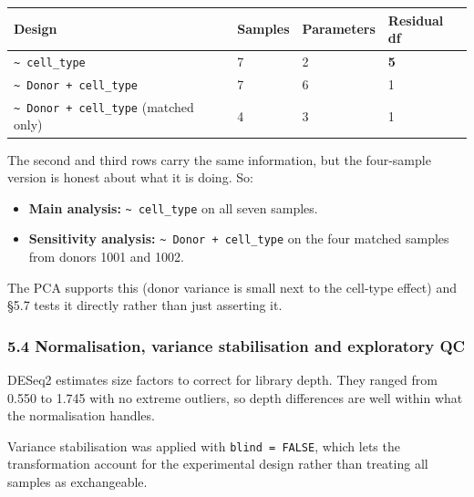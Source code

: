 \documentclass[
  11pt,
  a4paper,
]{article}
\providecommand{\tightlist}{%
  \setlength{\itemsep}{0pt}\setlength{\parskip}{0pt}}
\begin{document}
\begin{longtable}[]{@{}llll@{}}
\toprule\noalign{}
Design & Samples & Parameters & Residual df \\
\midrule\noalign{}
\endhead
\bottomrule\noalign{}
\endlastfoot
\texttt{\textasciitilde{}\ cell\_type} & 7 & 2 & \textbf{5} \\
\texttt{\textasciitilde{}\ Donor\ +\ cell\_type} & 7 & 6 & 1 \\
\texttt{\textasciitilde{}\ Donor\ +\ cell\_type} (matched only) & 4 & 3
& 1 \\
\end{longtable}

The second and third rows carry the same information, but the
four-sample version is honest about what it is doing. So:

\begin{itemize}
\tightlist
\item
  \textbf{Main analysis:} \texttt{\textasciitilde{}\ cell\_type} on all
  seven samples.
\item
  \textbf{Sensitivity analysis:}
  \texttt{\textasciitilde{}\ Donor\ +\ cell\_type} on the four matched
  samples from donors 1001 and 1002.
\end{itemize}

The PCA supports this (donor variance is small next to the cell-type
effect) and §5.7 tests it directly rather than just asserting it.

\hypertarget{normalisation-variance-stabilisation-and-exploratory-qc}{%
\subsubsection{5.4 Normalisation, variance stabilisation and exploratory
QC}\label{normalisation-variance-stabilisation-and-exploratory-qc}}

DESeq2 estimates size factors to correct for library depth. They ranged
from 0.550 to 1.745 with no extreme outliers, so depth differences are
well within what the normalisation handles.

Variance stabilisation was applied with \texttt{blind\ =\ FALSE}, which
lets the transformation account for the experimental design rather than
treating all samples as exchangeable.
\end{document}
